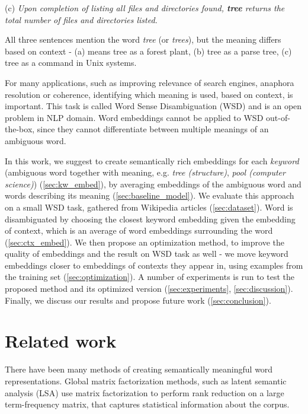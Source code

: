 \documentclass{llncs}
\begin{document}
(c) \textit{Upon completion of listing all files and directories found, \textbf{tree} returns the total number of files and directories listed.}
\medskip

All three sentences mention the word \textit{tree} (or \textit{trees}), but the meaning differs based on context - (a) means tree as a forest plant, (b) tree as a parse tree, (c) tree as a command in Unix systems.

For many applications, such as improving relevance of search engines, anaphora resolution or coherence, identifying which meaning is used, based on context, is important.
This task is called Word Sense Disambiguation (WSD) and is an open problem in NLP domain.
Word embeddings cannot be applied to WSD out-of-the-box, since they cannot differentiate between multiple meanings of an ambiguous word.

In this work, we suggest to create semantically rich embeddings for each \textit{keyword} (ambiguous word together with meaning, e.g. \textit{tree (structure)}, \textit{pool (computer science)}) (\ref{sec:kw_embed}), by averaging embeddings of the ambiguous word and words describing its meaning (\ref{sec:baseline_model}).
We evaluate this approach on a small WSD task, gathered from Wikipedia articles (\ref{sec:dataset}).
Word is disambiguated by choosing the closest keyword embedding given the embedding of context, which is an average of word embeddings surrounding the word (\ref{sec:ctx_embed}).
We then propose an optimization method, to improve the quality of embeddings and the result on WSD task as well -  we move keyword embeddings closer to embeddings of contexts they appear in, using examples from the training set (\ref{sec:optimization}).
A number of experiments is run to test the proposed method and its optimized version (\ref{sec:experiments}, \ref{sec:discussion}).
Finally, we discuss our results and propose future work (\ref{sec:conclusion}).

\section{Related work}
\label{sec:related_work}


There have been many methods of creating semantically meaningful word representations.
Global matrix factorization methods, such as latent semantic analysis (LSA)\cite{LSA} use matrix factorization to perform rank reduction on a large term-frequency matrix, that captures statistical information about the corpus.
\end{document}
